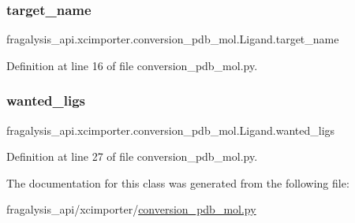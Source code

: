 \subsubsection{\texorpdfstring{target\+\_\+name}{target\_name}}
{\footnotesize\ttfamily fragalysis\+\_\+api.\+xcimporter.\+conversion\+\_\+pdb\+\_\+mol.\+Ligand.\+target\+\_\+name}



Definition at line 16 of file conversion\+\_\+pdb\+\_\+mol.\+py.

\mbox{\label{classfragalysis__api_1_1xcimporter_1_1conversion__pdb__mol_1_1_ligand_ae4f4ee5bf6c21bd59c1e52da2b4f67b5}} 
\subsubsection{\texorpdfstring{wanted\+\_\+ligs}{wanted\_ligs}}
{\footnotesize\ttfamily fragalysis\+\_\+api.\+xcimporter.\+conversion\+\_\+pdb\+\_\+mol.\+Ligand.\+wanted\+\_\+ligs}



Definition at line 27 of file conversion\+\_\+pdb\+\_\+mol.\+py.



The documentation for this class was generated from the following file\+:\begin{DoxyCompactItemize}
\item 
fragalysis\+\_\+api/xcimporter/\hyperlink{conversion__pdb__mol_8py}{conversion\+\_\+pdb\+\_\+mol.\+py}\end{DoxyCompactItemize}
